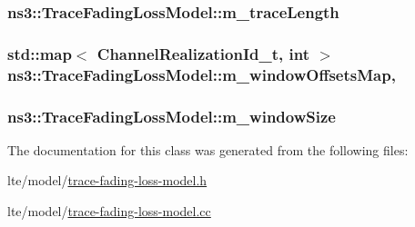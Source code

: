 \subsubsection[{\texorpdfstring{m\+\_\+trace\+Length}{m_traceLength}}]{ ns3\+::\+Trace\+Fading\+Loss\+Model\+::m\+\_\+trace\+Length\hspace{0.3cm}{\ttfamily [private]}}\hypertarget{classns3_1_1TraceFadingLossModel_a0f900aa679db8209d997e5253e3e16e4}{}\label{classns3_1_1TraceFadingLossModel_a0f900aa679db8209d997e5253e3e16e4}
\subsubsection[{\texorpdfstring{m\+\_\+window\+Offsets\+Map}{m_windowOffsetsMap}}]{\setlength{\rightskip}{0pt plus 5cm}std\+::map$<$ {\bf Channel\+Realization\+Id\+\_\+t}, int $>$ ns3\+::\+Trace\+Fading\+Loss\+Model\+::m\+\_\+window\+Offsets\+Map\hspace{0.3cm}{\ttfamily [mutable]}, {\ttfamily [private]}}\hypertarget{classns3_1_1TraceFadingLossModel_aba701b6e63395fd422f72cd3cd08564a}{}\label{classns3_1_1TraceFadingLossModel_aba701b6e63395fd422f72cd3cd08564a}
\subsubsection[{\texorpdfstring{m\+\_\+window\+Size}{m_windowSize}}]{ ns3\+::\+Trace\+Fading\+Loss\+Model\+::m\+\_\+window\+Size\hspace{0.3cm}{\ttfamily [private]}}\hypertarget{classns3_1_1TraceFadingLossModel_ad872ee7d3fec738e41519fa6562c48fb}{}\label{classns3_1_1TraceFadingLossModel_ad872ee7d3fec738e41519fa6562c48fb}


The documentation for this class was generated from the following files\+:\begin{DoxyCompactItemize}
\item 
lte/model/\hyperlink{lte_2model_2trace-fading-loss-model_8h}{trace-\/fading-\/loss-\/model.\+h}\item 
lte/model/\hyperlink{lte_2model_2trace-fading-loss-model_8cc}{trace-\/fading-\/loss-\/model.\+cc}\end{DoxyCompactItemize}
